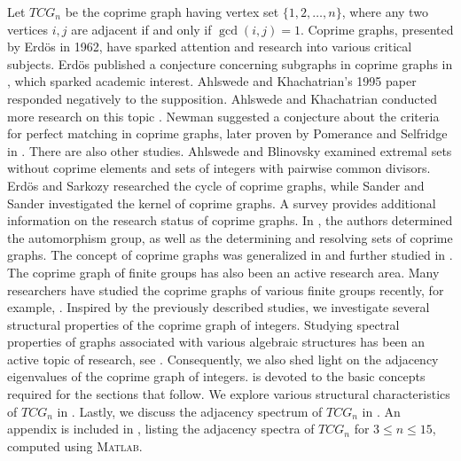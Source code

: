 \documentclass[12pt]{article}
\begin{document}
	Let $TCG_n$ be the coprime graph having vertex set $\{1,2,\ldots,n\}$, where any two vertices  $i,j$ are adjacent if and only if $\gcd(i,j)=1$.
	Coprime graphs, presented by Erdös \cite{erdos1961remarks} in 1962, have sparked attention and research into various critical subjects. Erdös published a conjecture concerning subgraphs in coprime graphs in \cite{erdos1961remarks}, which sparked academic interest. Ahlswede and Khachatrian's 1995 paper \cite{ahlswede1994extremal} responded negatively to the supposition. Ahlswede and Khachatrian conducted more research on this topic \cite{ahlswede1995maximal,ahlswede1996sets}. Newman suggested a conjecture about the criteria for perfect matching in coprime graphs, later proven by Pomerance and Selfridge in \cite{pomerance1980proof}. There are also other studies. Ahlswede and Blinovsky \cite{ahlswede2006maximal} examined extremal sets without coprime elements and sets of integers with pairwise common divisors. Erdös and Sarkozy \cite{erdHos1997cycles} researched the cycle of coprime graphs, while Sander and Sander \cite{sander2009kernel} investigated the kernel of coprime graphs. A survey \cite{rao2011creative} provides additional information on the research status of coprime graphs.
	In \cite{pan2019full}, the authors determined the automorphism group, as well as the determining and resolving sets of coprime graphs.
	The concept of coprime graphs was generalized in \cite{sriram2014} and further studied in \cite{sriramgeneralised}. 
	The coprime graph of finite groups has also been an active research area. Many researchers have studied the coprime graphs of various finite groups recently, for example, \cite{dorbidi2016note,selvakumar2017classification,hamm2021parameters,banerjee2021laplacian,madhumitha2024graphs,ma2014coprime}.
	Inspired by the previously described studies, we investigate several structural properties of the coprime graph of integers.
	Studying spectral properties of graphs associated with various algebraic structures has been an active topic of research, see \cite{rehman2024exploring,rehman2024randic,rather2023normalized,shen2023laplacian,alsaluli2024laplacian,banerjee2022spectra,banerjee2022laplacian,banerjee2023distance,banerjee2023structural}.
	Consequently, we also shed light on the adjacency eigenvalues of the coprime graph of integers.
	 is devoted to the basic concepts required for the sections that follow. We explore various structural characteristics of \( TCG_n \) in . Lastly, we discuss the adjacency spectrum of \( TCG_n \) in . An appendix is included in , listing the adjacency spectra of \( TCG_n \) for \( 3 \leq n \leq 15 \), computed using \textsc{Matlab}.
	
\end{document}
